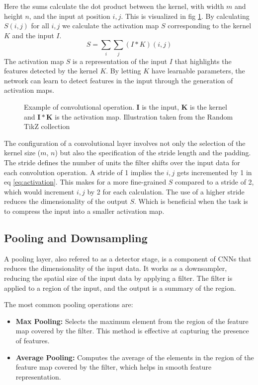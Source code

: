 Here the sums calculate the dot product between the kernel, with width $m$ and height $n$, and the input at position $i, j$. This is visualized in fig \ref{fig:conv}. By calculating $S(i, j)$ for all $i, j$ we calculate the activation map $S$ corresponding to the kernel $K$ and the input $I$.
\begin{equation}
    S = \sum_i \sum_j (I*K)(i, j)
    \label{eq:activation}
\end{equation}
The activation map $S$ is a representation of the input $I$ that highlights the features detected by the kernel $K$. 
By letting $K$ have learnable parameters, the network can learn to detect features in the input through the generation of activation maps.

\begin{figure}[H]
    \centering
    
    \caption{Example of convolutional operation. $\mathbf{I}$ is the input, $\mathbf{K}$ is the kernel and $\mathbf{I} * \mathbf{K}$ is the activation map. Illustration taken from the Random TikZ collection\cite{RiebesellTikZ2022}}
    \label{fig:conv}
\end{figure}

The configuration of a convolutional layer involves not only the selection of the kernel size ($m$, $n$) but also the specification of the stride length and the padding. 
The stride defines the number of units the filter shifts over the input data for each convolution operation. A stride of 1 implies the $i,j$ gets incremented by 1 in eq \ref{eq:activation}.
This makes for a more fine-grained $S$ compared to a stride of 2, which would increment $i,j$ by 2 for each calculation. The use of a higher stride reduces the dimensionality of the output $S$.
Which is beneficial when the task is to compress the input into a smaller activation map.

\subsection{Pooling and Downsampling}
A pooling layer, also refered to as a detector stage, is a component of CNNs that reduces the dimensionality of the input data.
It works as a downsampler, reducing the spatial size of the input data by applying a filter. The filter is applied to a region of the input, and the output is a summary of the region.

The most common pooling operations are:
\begin{itemize}
    \item \textbf{Max Pooling:} Selects the maximum element from the region of the feature map covered by the filter. This method is effective at capturing the presence of features.
    \item \textbf{Average Pooling:} Computes the average of the elements in the region of the feature map covered by the filter, which helps in smooth feature representation.
\end{itemize}

